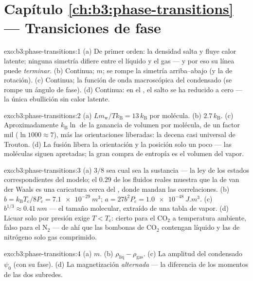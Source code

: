 \section*{Capítulo \ref{ch:b3:phase-transitions} --- Transiciones de fase}

\begin{solution}{exo:b3:phase-transitions:1}
(a) De primer orden: la densidad salta y fluye calor latente; ninguna simetría
difiere entre el líquido y el gas --- y por eso su línea puede
\emph{terminar}. (b) Continua;  $m$; se rompe la simetría
arriba--abajo (y la de rotación). (c) Continua; la función de onda macroscópica
del condensado (se rompe un ángulo de fase). (d) Continua:
en el , el salto se ha reducido a cero --- la única
ebullición sin calor latente.
\end{solution}

\begin{solution}{exo:b3:phase-transitions:2}
(a) $Lm_{\text{w}}/Tk_{\text{B}} = 13\,k_{\text{B}}$ por molécula.
(b) $2.7\,k_{\text{B}}$. (c) Aproximadamente $k_{\text{B}}\ln$ de la
ganancia de volumen por molécula, de un factor mil ($\ln1000 \approx 7$), más
las orientaciones liberadas: la decena casi universal de Trouton. (d)
La fusión libera la orientación y la posición solo un poco --- las
moléculas siguen apretadas; la gran compra de entropía es el volumen
del vapor.
\end{solution}

\begin{solution}{exo:b3:phase-transitions:3}
(a) $3/8$ sea cual sea la sustancia --- la ley de los estados
correspondientes del modelo; el $0.29$ de los fluidos reales muestra que la de van der Waals
es una caricatura cerca del , donde mandan las correlaciones. (b) $b =
k_{\text{B}}T_{\text{c}}/8P_{\text{c}} = \qty{7.1e-29}{m^3}$; $a =
27b^2P_{\text{c}} = \qty{1.0e-48}{J.m^3}$. (c) $b^{1/3} \approx
\qty{0.41}{nm}$ --- el tamaño molecular, extraído de una tabla
de vapor. (d) Licuar solo por presión exige $T <
T_{\text{c}}$: cierto para el CO$_2$ a temperatura ambiente, falso para el
N$_2$ --- de ahí que las bombonas de CO$_2$ contengan líquido y las de nitrógeno
solo gas comprimido.
\end{solution}

\begin{solution}{exo:b3:phase-transitions:4}
(a) $m$. (b) $\rho_{\text{liq}} - \rho_{\text{gas}}$. (c) La
amplitud del condensado $\psi_0$ (con su fase). (d) La
magnetización \emph{alternada} --- la diferencia de los momentos de las dos
subredes.
\end{solution}

